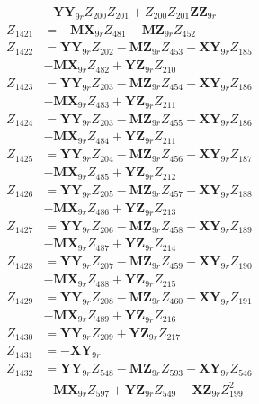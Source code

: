 \begin{multicols}{2}
\begin{align}
&- \mathbf{YY}_{9r}Z_{200}Z_{201} + Z_{200}Z_{201}\mathbf{ZZ}_{9r} \nonumber \\
Z_{1421} &= - \mathbf{MX}_{9r}Z_{481} - \mathbf{MZ}_{9r}Z_{452} \nonumber \\
Z_{1422} &= \mathbf{YY}_{9r}Z_{202} - \mathbf{MZ}_{9r}Z_{453} - \mathbf{XY}_{9r}Z_{185}  \nonumber \\
&- \mathbf{MX}_{9r}Z_{482} + \mathbf{YZ}_{9r}Z_{210} \nonumber \\
Z_{1423} &= \mathbf{YY}_{9r}Z_{203} - \mathbf{MZ}_{9r}Z_{454} - \mathbf{XY}_{9r}Z_{186}  \nonumber \\
&- \mathbf{MX}_{9r}Z_{483} + \mathbf{YZ}_{9r}Z_{211} \nonumber \\
Z_{1424} &= \mathbf{YY}_{9r}Z_{203} - \mathbf{MZ}_{9r}Z_{455} - \mathbf{XY}_{9r}Z_{186}  \nonumber \\
&- \mathbf{MX}_{9r}Z_{484} + \mathbf{YZ}_{9r}Z_{211} \nonumber \\
Z_{1425} &= \mathbf{YY}_{9r}Z_{204} - \mathbf{MZ}_{9r}Z_{456} - \mathbf{XY}_{9r}Z_{187}  \nonumber \\
&- \mathbf{MX}_{9r}Z_{485} + \mathbf{YZ}_{9r}Z_{212} \nonumber \\
Z_{1426} &= \mathbf{YY}_{9r}Z_{205} - \mathbf{MZ}_{9r}Z_{457} - \mathbf{XY}_{9r}Z_{188}  \nonumber \\
&- \mathbf{MX}_{9r}Z_{486} + \mathbf{YZ}_{9r}Z_{213} \nonumber \\
Z_{1427} &= \mathbf{YY}_{9r}Z_{206} - \mathbf{MZ}_{9r}Z_{458} - \mathbf{XY}_{9r}Z_{189}  \nonumber \\
&- \mathbf{MX}_{9r}Z_{487} + \mathbf{YZ}_{9r}Z_{214} \nonumber \\
Z_{1428} &= \mathbf{YY}_{9r}Z_{207} - \mathbf{MZ}_{9r}Z_{459} - \mathbf{XY}_{9r}Z_{190}  \nonumber \\
&- \mathbf{MX}_{9r}Z_{488} + \mathbf{YZ}_{9r}Z_{215} \nonumber \\
Z_{1429} &= \mathbf{YY}_{9r}Z_{208} - \mathbf{MZ}_{9r}Z_{460} - \mathbf{XY}_{9r}Z_{191}  \nonumber \\
&- \mathbf{MX}_{9r}Z_{489} + \mathbf{YZ}_{9r}Z_{216} \nonumber \\
Z_{1430} &= \mathbf{YY}_{9r}Z_{209} + \mathbf{YZ}_{9r}Z_{217} \nonumber \\
Z_{1431} &= -\mathbf{XY}_{9r} \nonumber \\
Z_{1432} &= \mathbf{YY}_{9r}Z_{548} - \mathbf{MZ}_{9r}Z_{593} - \mathbf{XY}_{9r}Z_{546}  \nonumber \\
&- \mathbf{MX}_{9r}Z_{597} + \mathbf{YZ}_{9r}Z_{549} - \mathbf{XZ}_{9r}Z_{199}^2  \nonumber \\

\end{align}
\end{multicols}
